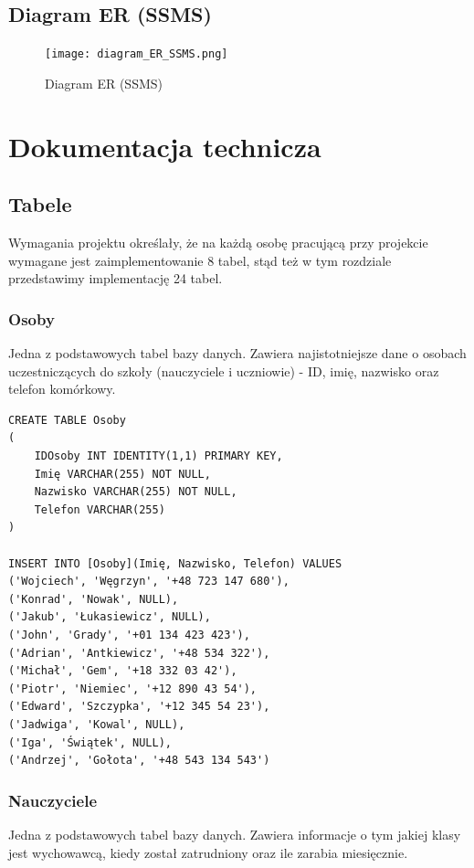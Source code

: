 \documentclass[60pt]{article}
\begin{document}
\newpage
\subsection{Diagram ER (SSMS)}

\begin{figure}[h]
  \texttt{[image: diagram\_ER\_SSMS.png]}
  \caption{Diagram ER (SSMS)}
  \label{Diagram ER (SSMS)}
\end{figure}

\newpage
\section{Dokumentacja technicza}

\subsection{Tabele}

Wymagania projektu określały, że na każdą osobę pracującą przy projekcie wymagane jest zaimplementowanie 8 tabel, stąd też w tym rozdziale przedstawimy implementację 24 tabel.

\subsubsection{Osoby}
Jedna z podstawowych tabel bazy danych. Zawiera najistotniejsze dane o osobach uczestniczących do szkoły (nauczyciele i uczniowie) - ID, imię, nazwisko oraz telefon komórkowy.

\begin{verbatim}
CREATE TABLE Osoby
(
    IDOsoby INT IDENTITY(1,1) PRIMARY KEY,
    Imię VARCHAR(255) NOT NULL,
    Nazwisko VARCHAR(255) NOT NULL,
    Telefon VARCHAR(255)
)

INSERT INTO [Osoby](Imię, Nazwisko, Telefon) VALUES
('Wojciech', 'Węgrzyn', '+48 723 147 680'),
('Konrad', 'Nowak', NULL),
('Jakub', 'Łukasiewicz', NULL),
('John', 'Grady', '+01 134 423 423'),
('Adrian', 'Antkiewicz', '+48 534 322'),
('Michał', 'Gem', '+18 332 03 42'),
('Piotr', 'Niemiec', '+12 890 43 54'),
('Edward', 'Szczypka', '+12 345 54 23'),
('Jadwiga', 'Kowal', NULL),
('Iga', 'Świątek', NULL),
('Andrzej', 'Gołota', '+48 543 134 543')
\end{verbatim}

\subsubsection{Nauczyciele}
 Jedna z podstawowych tabel bazy danych. Zawiera informacje o tym jakiej klasy jest wychowawcą, kiedy został zatrudniony oraz ile zarabia miesięcznie.
 
\end{document}
